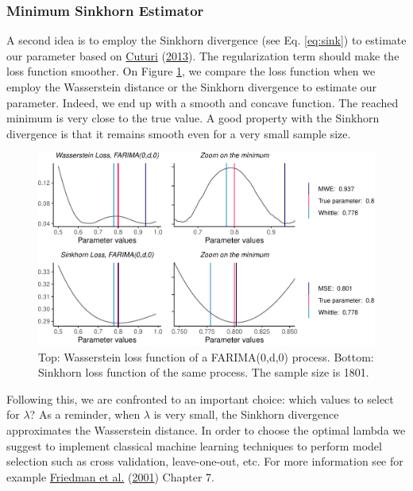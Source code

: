 \documentclass[
  11pt,
]{article}
\begin{document}
\hypertarget{minimum-sinkhorn-estimator}{%
\subsubsection{Minimum Sinkhorn
Estimator}\label{minimum-sinkhorn-estimator}}

A second idea is to employ the Sinkhorn divergence (see Eq.
\ref{eq:sink}) to estimate our parameter based on
\protect\hyperlink{ref-cuturi2013sinkhorn}{Cuturi}
(\protect\hyperlink{ref-cuturi2013sinkhorn}{2013}). The regularization
term should make the loss function smoother. On Figure
\ref{fig:sinkhorn}, we compare the loss function when we employ the
Wasserstein distance or the Sinkhorn divergence to estimate our
parameter. Indeed, we end up with a smooth and concave function. The
reached minimum is very close to the true value. A good property with
the Sinkhorn divergence is that it remains smooth even for a very small
sample size.

\begin{figure}

{\centering \includegraphics[width=0.65\linewidth]{Master_thesis_V2_files/figure-latex/sinkhorn-1} 

}

\caption{Top: Wasserstein loss function of a FARIMA(0,d,0) process. Bottom: Sinkhorn loss function of the same process. The sample size is 1801.}\label{fig:sinkhorn}
\end{figure}

Following this, we are confronted to an important choice: which values
to select for \(\lambda\)? As a reminder, when \(\lambda\) is very
small, the Sinkhorn divergence approximates the Wasserstein distance. In
order to choose the optimal lambda we suggest to implement classical
machine learning techniques to perform model selection such as cross
validation, leave-one-out, etc. For more information see for example
\protect\hyperlink{ref-friedman2001elements}{Friedman et al.}
(\protect\hyperlink{ref-friedman2001elements}{2001}) Chapter 7.
\end{document}
